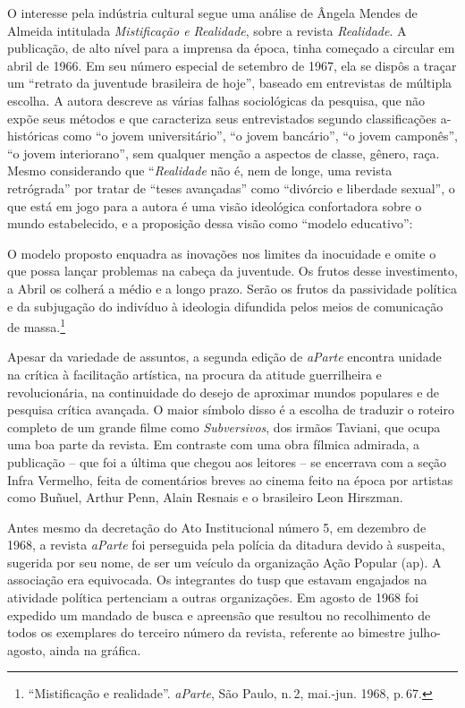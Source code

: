 O interesse pela indústria cultural segue uma análise de Ângela Mendes
de Almeida intitulada {\it Mistificação e Realidade}, sobre a revista
{\it Realidade}. A publicação, de alto nível para a imprensa da época,
tinha começado a circular em abril de 1966. Em seu número especial de
setembro de 1967, ela se dispôs a traçar um “retrato da juventude
brasileira de hoje”, baseado em entrevistas de múltipla escolha. A
autora descreve as várias falhas sociológicas da pesquisa, que não expõe
seus métodos e que caracteriza seus entrevistados segundo classificações
a-históricas como “o jovem universitário”, “o jovem bancário”, “o jovem
camponês”, “o jovem interiorano”, sem qualquer menção a aspectos de
classe, gênero, raça. Mesmo considerando que “{\it Realidade} não é, nem
de longe, uma revista retrógrada” por tratar de “teses avançadas” como
“divórcio e liberdade sexual”, o que está em jogo para a autora é uma
visão ideológica confortadora sobre o mundo estabelecido, e a proposição
dessa visão como “modelo educativo”:

\startblockquote
O modelo proposto enquadra as inovações nos limites da inocuidade e
omite o que possa lançar problemas na cabeça da juventude. Os frutos
desse investimento, a Abril os colherá a médio e a longo prazo. Serão os
frutos da passividade política e da subjugação do indivíduo à ideologia
difundida pelos meios de comunicação de massa.\footnote{“Mistificação e
  realidade”. {\it aParte}, São Paulo, n.\,2, mai.-jun. 1968, p.\,67.}
\stopblockquote

Apesar da variedade de assuntos, a segunda edição de {\it aParte}
encontra unidade na crítica à facilitação artística, na procura da
atitude guerrilheira e revolucionária, na continuidade do desejo de
aproximar mundos populares e de pesquisa crítica avançada. O maior
símbolo disso é a escolha de traduzir o roteiro completo de um grande
filme como {\it Subversivos}, dos irmãos Taviani, que ocupa uma boa
parte da revista. Em contraste com uma obra fílmica admirada, a
publicação -- que foi a última que chegou aos leitores -- se encerrava com
a seção Infra Vermelho, feita de comentários breves ao cinema feito na
época por artistas como Buñuel, Arthur Penn, Alain Resnais e o
brasileiro Leon Hirszman.


Antes mesmo da decretação do Ato Institucional número 5, em dezembro de
1968, a revista {\it aParte} foi perseguida pela polícia da ditadura
devido à suspeita, sugerida por seu nome, de ser um veículo da
organização Ação Popular ({\sc ap}). A associação era equivocada. Os
integrantes do {\sc tusp} que estavam engajados na atividade política
pertenciam a outras organizações. Em agosto de 1968 foi expedido um
mandado de busca e apreensão que resultou no recolhimento de todos os
exemplares do terceiro número da revista, referente ao bimestre
julho-agosto, ainda na gráfica.

